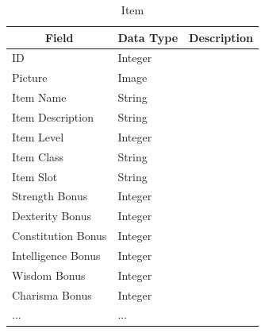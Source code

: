 \documentclass[12pt,letterpaper]{article}
\begin{document}
	\begin{table}[h]
		\begin{tabular}{| l | l | p{7cm} |}
			\hline
			\multicolumn{1}{|c|}{\bf{Field}} & \multicolumn{1}{|c|}{\bf{Data Type}} & \multicolumn{1}{|c|}{\bf{Description}}\\ \hline
			ID & Integer & \\ \hline
			Picture & Image & \\ \hline
			Item Name & String & \\ \hline
			Item Description & String & \\ \hline
			Item Level & Integer & \\ \hline
			Item Class & String & \\ \hline
			Item Slot & String & \\ \hline
			Strength Bonus & Integer & \\ \hline
			Dexterity Bonus & Integer & \\ \hline
			Constitution Bonus & Integer & \\ \hline
			Intelligence Bonus & Integer & \\ \hline
			Wisdom Bonus & Integer & \\ \hline
			Charisma Bonus & Integer & \\ \hline
			... & ... & \\ \hline
			
		\end{tabular}
		\caption{Item}	
		\label{tab:tableItem}
	\end{table}
\end{document}
